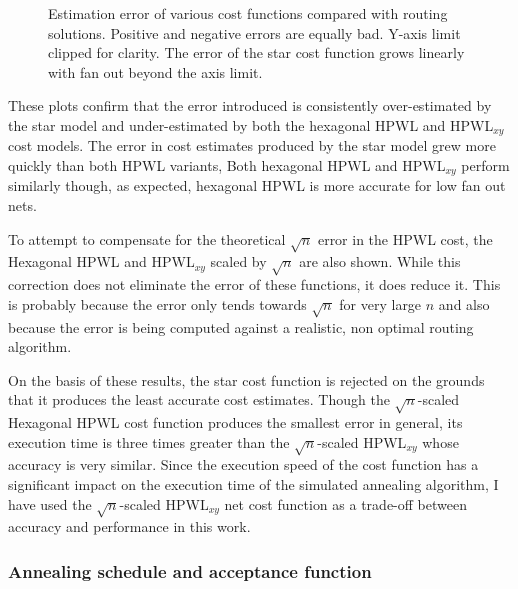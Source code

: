 				\begin{figure}
					\center
					
					\caption[Estimation error of various cost functions.]%
					{Estimation error of various cost functions compared with
					routing solutions. Positive and negative errors are equally bad.
					Y-axis limit clipped for clarity. The error of the star cost function
					grows linearly with fan out beyond the axis limit.}
					\label{fig:cost-function-error}
				\end{figure}
				
				These plots confirm that the error introduced is consistently
				over-estimated by the star model and under-estimated by both the
				hexagonal HPWL and HPWL${_{xy}}$ cost models. The error in cost
				estimates produced by the star model grew more quickly than both HPWL
				variants, Both hexagonal HPWL and HPWL$_{xy}$ perform similarly though,
				as expected, hexagonal HPWL is more accurate for low fan out nets.
				
				To attempt to compensate for the theoretical $\sqrt{n}$ error in the
				HPWL cost, the Hexagonal HPWL and HPWL$_{xy}$ scaled by $\sqrt{n}$ are
				also shown. While this correction does not eliminate the error of these
				functions, it does reduce it. This is probably because the error only
				tends towards $\sqrt{n}$ for very large $n$ \cite{chung79} and also
				because the error is being computed against a realistic, non optimal
				routing algorithm.
				
				On the basis of these results, the star cost function is rejected on
				the grounds that it produces the least accurate cost estimates. Though
				the $\sqrt{n}$-scaled Hexagonal HPWL cost function produces the
				smallest error in general, its execution time is three times greater
				than the $\sqrt{n}$-scaled HPWL$_{xy}$ whose accuracy is very similar.
				Since the execution speed of the cost function has a significant impact
				on the execution time of the simulated annealing algorithm, I have used
				the $\sqrt{n}$-scaled HPWL$_{xy}$ net cost function as a trade-off
				between accuracy and performance in this work.
				
			\subsubsection{Annealing schedule and acceptance function}
				
				\label{sec:placement-schedule-acceptance}
				
